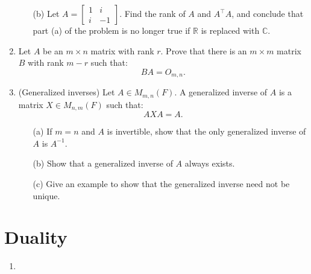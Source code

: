 \documentclass{article}
\theoremstyle{remark}
\begin{document}
\begin{enumerate}
\begin{enumerate}
            \item[(b)] Let \( A = \begin{bmatrix} 1 & i \\ i & -1 \end{bmatrix} \). Find the rank of \( A \) and \( A^\top A \), and conclude that part (a) of the problem is no longer true if \( \mathbb{R} \) is replaced with \( \mathbb{C} \).
        \end{enumerate}

        \item Let \( A \) be an \( m \times n \) matrix with rank \( r \). Prove that there is an \( m \times m \) matrix \( B \) with rank \( m - r \) such that:
        \[
        B A = O_{m,n}.
        \]

        \item (Generalized inverses) Let \( A \in M_{m,n}(F) \). A generalized inverse of \( A \) is a matrix \( X \in M_{n,m}(F) \) such that:
        \[
        A X A = A.
        \]
        \begin{enumerate}
            \item[(a)] If \( m = n \) and \( A \) is invertible, show that the only generalized inverse of \( A \) is \( A^{-1} \).
            \item[(b)] Show that a generalized inverse of \( A \) always exists.
            \item[(c)] Give an example to show that the generalized inverse need not be unique.
        \end{enumerate}
    \end{enumerate}
\section*{Duality}
    \begin{enumerate}
        \item 
    \end{enumerate}
\end{document}
